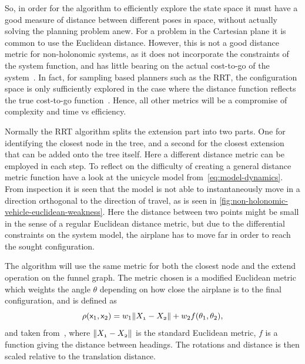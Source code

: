 So, in order for the \rrtfunnel{} algorithm to efficiently explore the state
space it must have a good measure of distance between different poses in space,
without actually solving the planning problem anew. For a problem in the
Cartesian plane it is common to use the Euclidean distance. However, this is not
a good distance metric for non-holonomic systems, as it does not incorporate the
constraints of the system function, and has little bearing on the actual
cost-to-go of the system~\cite{parkFeedbackMotionPlanning2015}. In fact, for
sampling based planners such as the \ac{RRT}, the configuration space is only
sufficiently explored in the case where the distance function reflects the true
cost-to-go function~\cite{pengchengReducingMetricSensitivity2001}. Hence, all
other metrics will be a compromise of complexity and time vs efficiency.

Normally the \ac{RRT} algorithm splits the extension part into two parts. One
for identifying the closest node in the tree, and a second for the closest
extension that can be added onto the tree itself. Here a different distance
metric can be employed in each step. To reflect on the difficulty of creating a
general distance metric function have a look at the unicycle model
from~\cref{eq:model-dynamics}. From inspection it is seen that the model is not
able to instantaneously move in a direction orthogonal to the direction of
travel, as is seen in \cref{fig:non-holonomic-vehicle-euclidean-weakness}. Here
the distance between two points might be small in the sense of a regular
Euclidean distance metric, but due to the differential constraints on the system
model, the airplane has to move far in order to reach the sought configuration.

The \rrtfunnel{} algorithm will use the same metric for both the closest node
and the extend operation on the funnel graph. The metric chosen is a modified
Euclidean metric which weights the angle \(\theta\) depending on how close the
airplane is to the final configuration, and is defined as
\[
  \rho({\mathbf{\mathsf{x}}}_{1}, {\mathbf{\mathsf{x}}}_{2}) = w_{1}\lVert\mathnormal{X_{1}} -
    \mathnormal{X_{2}}\rVert + w_{2}f(\theta_1,\theta_2) ,
\]
and taken from~\cite{kuffnerEffectiveSamplingDistance2004}, where
\(\lVert\mathnormal{X_{1}} - \mathnormal{X_{2}}\rVert\) is the standard Euclidean
metric, \(f\) is a function giving the distance between headings. The rotations
and distance is then scaled relative to the translation distance.

